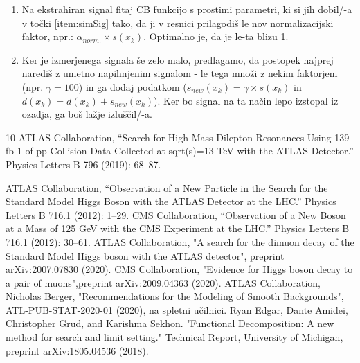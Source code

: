 \documentclass[slovene,11pt,a4paper]{article}
\begin{document}
\begin{enumerate}
    \item \label{item:final} Na ekstrahiran signal fitaj CB funkcijo s prostimi parametri, ki si jih dobil/-a v točki \ref{item:simSig} tako, da ji v resnici prilagodiš le nov normalizacijski faktor, npr.: $\alpha_{norm.} \times s(x_k)$. Optimalno je, da je le-ta blizu 1.
    \item \label{item:asimov} Ker je izmerjenega signala še zelo malo, predlagamo, da postopek najprej narediš z umetno napihnjenim signalom - le tega množi z nekim faktorjem (npr. $\gamma = 100$) in ga dodaj podatkom ($s_{new}(x_k) = \gamma \times s(x_k)$ in $d(x_k) = d(x_k) + s_{new}(x_k)$). Ker bo signal na ta način lepo izstopal iz ozadja, ga boš lažje izluščil/-a.
\end{enumerate}

\begin{thebibliography}{10}
{ATLAS Collaboration}, “Search for High-Mass Dilepton Resonances Using 139 fb-1 of pp Collision Data Collected at sqrt(s)=13 TeV with the ATLAS Detector.” Physics Letters B 796 (2019): 68–87. 

{ATLAS Collaboration}, “Observation of a New Particle in the Search for the Standard Model Higgs Boson with the ATLAS Detector at the LHC.” Physics Letters B 716.1 (2012): 1–29. 
{CMS Collaboration}, “Observation of a New Boson at a Mass of 125 GeV with the CMS Experiment at the LHC.” Physics Letters B 716.1 (2012): 30–61. 
{ATLAS Collaboration}, "A search for the dimuon decay of the Standard Model Higgs boson with the ATLAS detector", preprint arXiv:2007.07830 (2020).
{CMS Collaboration}, "Evidence for Higgs boson decay to a pair of muons",preprint arXiv:2009.04363 (2020).
{ATLAS Collaboration}, Nicholas Berger, "Recommendations for the Modeling of Smooth Backgrounds", ATL-PUB-STAT-2020-01 (2020), na spletni učilnici. 
Ryan Edgar, Dante Amidei, Christopher Grud, and Karishma Sekhon. "Functional Decomposition: A new method for search and limit setting." Technical Report, University of Michigan, preprint arXiv:1805.04536 (2018).

\end{thebibliography}
\end{document}
